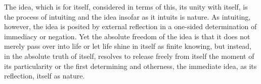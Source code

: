 The idea, which is for itself, considered in terms of this, its unity with itself,
is the process of intuiting and the idea insofar as it intuits is nature.
As intuiting, however, the idea is posited by external reflection
in a one-sided determination of immediacy or negation.
Yet the absolute freedom of the idea is that it does not merely pass over into life
or let life shine in itself as finite knowing, but instead,
in the absolute truth of itself, resolves to release freely from itself
the moment of its particularity or the first determining and otherness,
the immediate idea, as its reflection, itself as nature.
